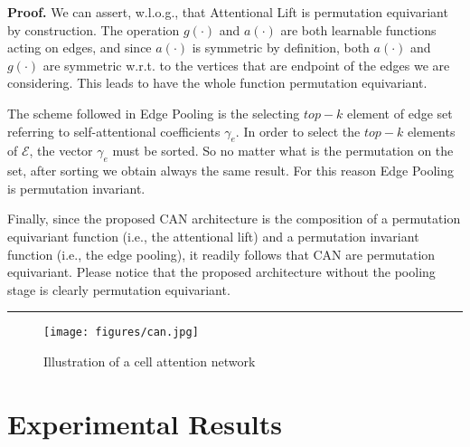 \documentclass{article}
\newenvironment{proof}[1][Proof]{\noindent \textbf{#1.} }{\qedsymbol}
\newcommand{\qedsymbol}{\hspace{\fill}\rule{1.5ex}{1.5ex}}
\begin{document}
\begin{proof}
We can assert, w.l.o.g., that Attentional Lift is permutation equivariant by construction. The operation $g(\cdot)$ and $a(\cdot)$ are both learnable functions acting on edges, and since $a(\cdot)$ is symmetric by definition, both $a(\cdot)$ and $g(\cdot)$  are symmetric w.r.t. to the vertices that are endpoint of the edges we are considering. This leads to have the whole function permutation equivariant. 

The scheme followed in Edge Pooling is the selecting $top-k$ element of edge set referring to self-attentional coefficients $\gamma_{e}$.
In order to select the $top-k$ elements of $\mathcal{E}$, the vector $\gamma_{e}$ must be sorted. So no matter what is the permutation on the set, after sorting we obtain always the same result. For this reason Edge Pooling is permutation invariant. 

Finally, since the proposed CAN architecture is the composition of a permutation equivariant function (i.e., the attentional lift) and a permutation invariant function (i.e., the edge pooling), it readily follows that CAN are permutation equivariant. Please notice that the proposed architecture without the pooling stage is clearly permutation equivariant.
\end{proof}




\begin{figure}[t]
    \centering
    \texttt{[image: figures/can.jpg]}
    \caption{Illustration of a cell attention network}
    \label{fig:tan}
\end{figure}

\section{Experimental Results}\label{sec:exp_res}
\end{document}
